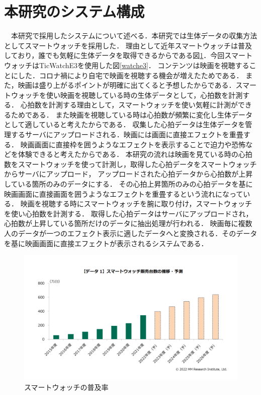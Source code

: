 \section{本研究のシステム構成}
　本研究で採用したシステムについて述べる．本研究では生体データの収集方法としてスマートウォッチを採用した．
理由として近年スマートウォッチは普及しており，誰でも気軽に生体データを取得できるからである図\ref{watchfukyuu}．今回スマートウォッチはTicWatchE3を使用した図\ref{watche3}．
コンテンツは映画を視聴することにした．コロナ禍により自宅で映画を視聴する機会が増えたためである．
また，映画は盛り上がるポイントが明確に出てくると予想したからである．スマートウォッチを使い映画を視聴している時の生体データとして，心拍数を計測する．
心拍数を計測する理由として，スマートウォッチを使い気軽に計測ができるためである．
また映画を視聴している時は心拍数が頻繁に変化し生体データとして適していると考えたからである．
収集した心拍データは生体データを管理するサーバにアップロードされる．映画には画面に直接エフェクトを重畳する．
映画画面に直接枠を囲うようなエフェクトを表示することで迫力や恐怖などを体験できると考えたからである．
本研究の流れは映画を見ている時の心拍数をスマートウォッチを使って計測し，取得した心拍データをスマートウォッチからサーバにアップロード，
アップロードされた心拍データから心拍数が上昇している箇所のみのデータにする．
その心拍上昇箇所のみの心拍データを基に映画画面に直接画面を囲うようなエフェクトを重畳するという流れになっている．
映画を視聴する時にスマートウォッチを腕に取り付け，スマートウォッチを使い心拍数を計測する．
取得した心拍データはサーバにアップロードされ，心拍数が上昇している箇所だけのデータに抽出処理が行われる．
映画毎に複数人のデータが一つのエフェクト表示に適したデータへと変換される．そのデータを基に映画画面に直接エフェクトが表示されるシステムである．


\begin{figure}[H]
    \centering
    \includegraphics[width=14cm]{images/chapter3/watchreserch.png}
    \caption{スマートウォッチの普及率}
    \label{watchfukyuu}
\end{figure}

